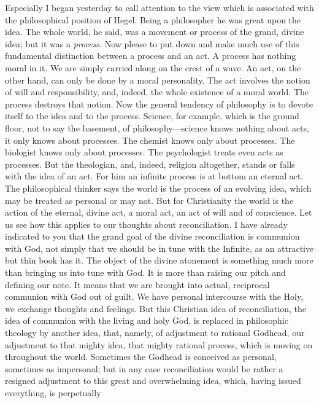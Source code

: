 \documentclass[draft]{ptfdoc}
\begin{document}
Especially I began yesterday to call attention 
to the view which is associated with the philosophical 
position of Hegel. Being a philosopher 
he was great upon the idea. The whole world, 
he said, was a movement or process of the grand, 
divine idea; but it was a \textit{process}. Now please 
to put down and make much use of this fundamental 
distinction between a process and an 
act. A process has nothing moral in it. We 
are simply carried along on the crest of a wave. 
An act, on the other hand, can only be done by 
a moral personality. The act involves the notion 
of will and responsibility, and, indeed, the whole 
existence of a moral world. The process destroys 
that notion. Now the general tendency of 
philosophy is to devote itself to the idea and 
to the process. Science, for example, which is 
the ground floor, not to say the basement, of 
philosophy---science knows nothing about acts, 
it only knows about processes. The chemist 
knows only about processes. The biologist 
knows only about processes. The psychologist 
treats even acts as processes. But the theologian, 
and, indeed, religion altogether, stands 
or falls with the idea of an act. For him an 
infinite process is at bottom an eternal act. The 
philosophical thinker says the world is the process 
of an evolving idea, which may be treated as 
personal or may not. But for Christianity the 
world is the action of the eternal, divine act, 
a moral act, an act of will and of conscience. 
Let us see how this applies to our thoughts 
about reconciliation. I have already indicated 
to you that the grand goal of the divine reconciliation 
is communion with God, not simply 
that we should be in tune with the Infinite, 
as an attractive but thin book has it. The 
object of the divine atonement is something 
much more than bringing us into tune with 
God. It is more than raising our pitch and 
defining our note. It means that we are 
brought into actual, reciprocal communion with 
God out of guilt. We have personal intercourse 
with the Holy, we exchange thoughts and feelings. 
But this Christian idea of reconciliation, 
the idea of communion with the living and 
holy God, is replaced in philosophic theology by 
another idea, that, namely, of adjustment to 
rational Godhead, our adjustment to that 
mighty idea, that mighty rational process, 
which is moving on throughout the world. 
Sometimes the Godhead is conceived as personal, 
sometimes as impersonal; but in any case 
reconciliation would be rather a resigned adjustment 
to this great and overwhelming idea, 
which, having issued everything, is perpetually 
\end{document}
